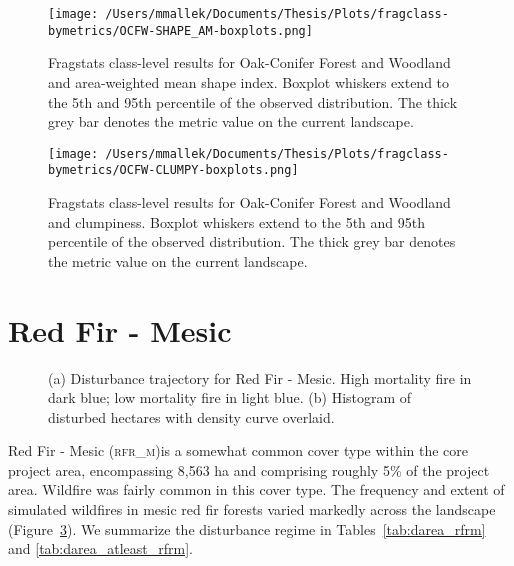 \begin{figure}[!htbp]
\centering
    \texttt{[image: /Users/mmallek/Documents/Thesis/Plots/fragclass-bymetrics/OCFW-SHAPE\_AM-boxplots.png]}
  \caption{Fragstats class-level results for Oak-Conifer Forest and Woodland and area-weighted mean shape index. Boxplot whiskers extend to the 5th and 95th percentile of the observed distribution. The thick grey bar denotes the metric value on the current landscape.}
  \label{fig:ocfw_shapeam}
\end{figure}


\begin{figure}[!htbp]
\centering
    \texttt{[image: /Users/mmallek/Documents/Thesis/Plots/fragclass-bymetrics/OCFW-CLUMPY-boxplots.png]}
  \caption{Fragstats class-level results for Oak-Conifer Forest and Woodland and clumpiness. Boxplot whiskers extend to the 5th and 95th percentile of the observed distribution. The thick grey bar denotes the metric value on the current landscape.}
  \label{fig:ocfw_clumpy}
\end{figure}



\clearpage
\section{Red Fir - Mesic} 
\begin{figure}[!htbp]
  \centering
  \caption{\small (a) Disturbance trajectory for Red Fir - Mesic. High mortality fire in dark blue; low mortality fire in light blue. (b) Histogram of disturbed hectares with density curve overlaid.} 
  \label{fig:darea_rfrm}
\end{figure}

Red Fir - Mesic (\textsc{rfr\_m})is a somewhat common cover type within the core project area, encompassing 8,563 ha and comprising roughly 5\% of the project area. Wildfire was fairly common in this cover type. The frequency and extent of simulated wildfires in mesic red fir forests varied markedly across the landscape (Figure~\ref{fig:darea_rfrm}). We summarize the disturbance regime in Tables~\ref{tab:darea_rfrm} and \ref{tab:darea_atleast_rfrm}.

